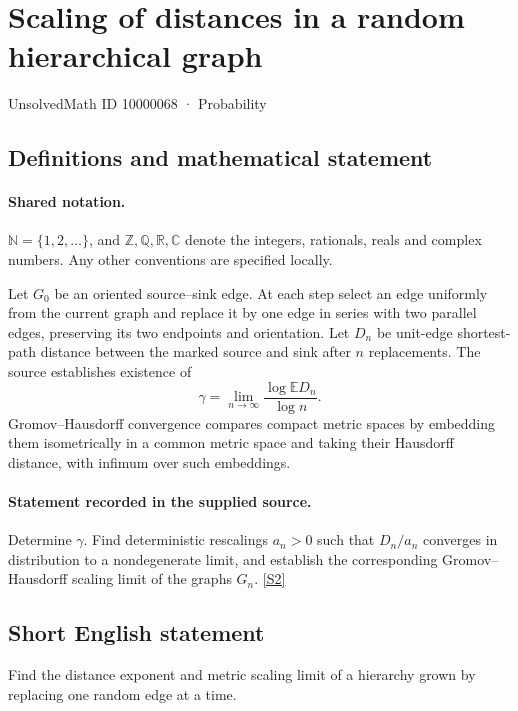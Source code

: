 \documentclass[11pt]{article}
\newcommand{\sref}[2]{\hyperlink{source:#1:#2}{[S#2]}}
\begin{document}
\setcounter{section}{10000067}
\section{Scaling of distances in a random hierarchical graph}\label{10000068}
{\small\sffamily UnsolvedMath ID 10000068 · Probability}
\subsection{Definitions and mathematical statement}

\paragraph{Shared notation.}$\mathbb N=\{1,2,\ldots\}$, and $\mathbb Z,\mathbb Q,\mathbb R,\mathbb C$ denote the integers, rationals, reals and complex numbers. Any other conventions are specified locally.


Let $G_0$ be an oriented source--sink edge. At each step select an edge uniformly from the current graph and replace it by one edge in series with two parallel edges, preserving its two endpoints and orientation. Let $D_n$ be unit-edge shortest-path distance between the marked source and sink after $n$ replacements. The source establishes existence of
\[\gamma=\lim_{n\to\infty}\frac{\log\mathbb E D_n}{\log n}.\]
Gromov--Hausdorff convergence compares compact metric spaces by embedding them isometrically in a common metric space and taking their Hausdorff distance, with infimum over such embeddings.
\paragraph{Statement recorded in the supplied source.}
Determine $\gamma$. Find deterministic rescalings $a_n>0$ such that $D_n/a_n$ converges in distribution to a nondegenerate limit, and establish the corresponding Gromov--Hausdorff scaling limit of the graphs $G_n$. \sref{10000068}{2}
\subsection{Short English statement}
Find the distance exponent and metric scaling limit of a hierarchy grown by replacing one random edge at a time.
\end{document}
